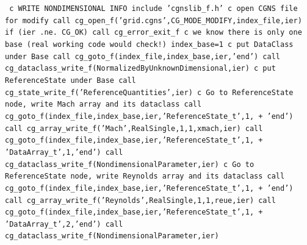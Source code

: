 \documentclass[12pt]{article}
\begin{document}
{\tt
\noindent c   WRITE NONDIMENSIONAL INFO
\newline\indent      include 'cgnslib\_f.h'
\newline c   open CGNS file for modify
\newline\indent      call cg\_open\_f('grid.cgns',CG\_MODE\_MODIFY,index\_file,ier)
\newline\indent      if (ier .ne. CG\_OK) call cg\_error\_exit\_f
\newline c   we know there is only one base (real working code would check!)
\newline\indent      index\_base=1
\newline c   put DataClass under Base
\newline\indent      call cg\_goto\_f(index\_file,index\_base,ier,'end')
\newline\indent      call cg\_dataclass\_write\_f(NormalizedByUnknownDimensional,ier)
\newline c   put ReferenceState under Base
\newline\indent      call cg\_state\_write\_f('ReferenceQuantities',ier)
\newline c   Go to ReferenceState node, write Mach array and its dataclass
\newline\indent      call cg\_goto\_f(index\_file,index\_base,ier,'ReferenceState\_t',1,
\newline + \indent  'end')
\newline\indent      call cg\_array\_write\_f('Mach',RealSingle,1,1,xmach,ier)
\newline\indent      call cg\_goto\_f(index\_file,index\_base,ier,'ReferenceState\_t',1,
\newline + \indent  'DataArray\_t',1,'end')
\newline\indent      call cg\_dataclass\_write\_f(NondimensionalParameter,ier)
\newline c   Go to ReferenceState node, write Reynolds array and its dataclass
\newline\indent      call cg\_goto\_f(index\_file,index\_base,ier,'ReferenceState\_t',1,
\newline + \indent  'end')
\newline\indent      call cg\_array\_write\_f('Reynolds',RealSingle,1,1,reue,ier)
\newline\indent      call cg\_goto\_f(index\_file,index\_base,ier,'ReferenceState\_t',1,
\newline + \indent  'DataArray\_t',2,'end')
\newline\indent      call cg\_dataclass\_write\_f(NondimensionalParameter,ier)
}
\end{document}
